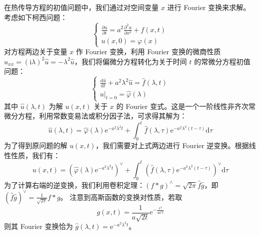 \documentclass[12pt,a4paper]{ctexart}
\begin{document}
	在热传导方程的初值问题中，我们通过对空间变量 $x$ 进行 Fourier 变换来求解。考虑如下柯西问题：
	\begin{equation}
		\begin{cases}
			\frac{\partial u}{\partial t} = a^2 \frac{\partial^2 u}{\partial x^2} + f(x,t) \\
			u(x,0) = \varphi(x)
		\end{cases}
	\end{equation}
	对方程两边关于变量 $x$ 作 Fourier 变换，利用 Fourier 变换的微商性质 $\widehat{u_{xx}} = (\mathrm{i}\lambda)^2 \hat{u} = -\lambda^2 \hat{u}$，我们将偏微分方程转化为关于时间 $t$ 的常微分方程初值问题：
	\begin{equation}
		\begin{cases}
			\frac{\mathrm{d}\hat{u}}{\mathrm{d}t} + a^2 \lambda^2 \hat{u} = \hat{f}(\lambda, t) \\
			\hat{u}|_{t=0} = \hat{\varphi}(\lambda)
		\end{cases}
	\end{equation}
	其中 $\hat{u}(\lambda, t)$ 为解 $u(x,t)$ 关于 $x$ 的 Fourier 变式。这是一个一阶线性非齐次常微分方程，利用常数变易法或积分因子法，可求得其解为：
	\begin{equation}
		\hat{u}(\lambda, t) = \hat{\varphi}(\lambda) \mathrm{e}^{-a^2 \lambda^2 t} + \int_0^t \hat{f}(\lambda, \tau) \mathrm{e}^{-a^2 \lambda^2 (t-\tau)} \mathrm{d}\tau
	\end{equation}
	为了得到原问题的解 $u(x,t)$，我们需要对上式两边进行 Fourier 逆变换。根据线性性质，我们有：
	\begin{equation}
		u(x,t) = \left( \hat{\varphi}(\lambda) \mathrm{e}^{-a^2 \lambda^2 t} \right)^{\vee} + \int_0^t \left( \hat{f}(\lambda, \tau) \mathrm{e}^{-a^2 \lambda^2 (t-\tau)} \right)^{\vee} \mathrm{d}\tau
	\end{equation}
	为了计算右端的逆变换，我们利用卷积定理：$(f * g)^{\wedge} = \sqrt{2\pi} \hat{f} \hat{g}$，即 $(\hat{f}\hat{g})^{\vee} = \frac{1}{\sqrt{2\pi}} f * g$。
	注意到高斯函数的变换对性质，若取
	\[
	g(x,t) = \frac{1}{a\sqrt{2t}} \mathrm{e}^{-\frac{x^2}{4a^2 t}}
	\]
	则其 Fourier 变换恰为 $\hat{g}(\lambda, t) = \mathrm{e}^{-a^2 \lambda^2 t}$。
	
\end{document}
